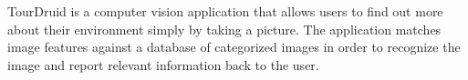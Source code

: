 TourDruid is a computer vision application that allows users to find out more about their environment simply by taking a picture. The application matches image features against a database of categorized images in order to recognize the image and report relevant information back to the user.